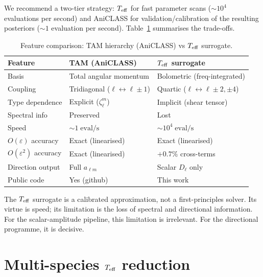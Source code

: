 We recommend a two-tier strategy:
$T_{\mathrm{eff}}$ for fast parameter scans ($\sim 10^4$ evaluations
per second) and AniCLASS for validation/calibration of
the resulting posteriors ($\sim 1$ evaluation per second).
Table~\ref{tab:feature-comparison} summarises the trade-offs.

\begin{table}[t]
\caption{Feature comparison: TAM hierarchy (AniCLASS) vs
  $T_{\mathrm{eff}}$ surrogate.}
\label{tab:feature-comparison}
\centering\footnotesize
\setlength{\tabcolsep}{3pt}
\begin{tabular}{lll}
\hline\hline
Feature & TAM (AniCLASS) & $T_{\mathrm{eff}}$ surrogate \\
\hline
Basis & Total angular momentum & Bolometric (freq-integrated) \\
Coupling & Tridiagonal ($\ell{\leftrightarrow}\ell{\pm}1$) &
  Quartic ($\ell{\leftrightarrow}\ell{\pm}2,{\pm}4$) \\
Type dependence & Explicit ($\zeta^m_\ell$) & Implicit (shear tensor) \\
Spectral info & Preserved & Lost \\
Speed & $\sim\!1\;\mathrm{eval/s}$ & $\sim\!10^4\;\mathrm{eval/s}$ \\
$O(\varepsilon)$ accuracy & Exact (linearised) & Exact (linearised) \\
$O(\varepsilon^2)$ accuracy & Exact (linearised) & $+0.7\%$ cross-terms \\
Direction output & Full $a_{\ell m}$ & Scalar $D_\ell$ only \\
Public code & Yes (github) & This work \\
\hline\hline
\end{tabular}
\end{table}

The $T_{\mathrm{eff}}$ surrogate is a calibrated approximation, not a
first-principles solver.  Its virtue is speed; its limitation
is the loss of spectral and directional information.  For
the scalar-amplitude pipeline, this limitation is irrelevant.
For the directional programme, it is decisive.



\section{Multi-species $T_{\mathrm{eff}}$ reduction}
\label{sec:multi-species-teff}


